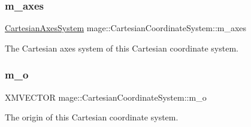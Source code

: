 \subsubsection{\texorpdfstring{m\+\_\+axes}{m\_axes}}
{\footnotesize\ttfamily \hyperlink{structmage_1_1_cartesian_axes_system}{Cartesian\+Axes\+System} mage\+::\+Cartesian\+Coordinate\+System\+::m\+\_\+axes\hspace{0.3cm}{\ttfamily [private]}}

The Cartesian axes system of this Cartesian coordinate system. \hypertarget{structmage_1_1_cartesian_coordinate_system_a1ea373bb91be991ee221a2ce1e02be2b}{}\label{structmage_1_1_cartesian_coordinate_system_a1ea373bb91be991ee221a2ce1e02be2b} 
\subsubsection{\texorpdfstring{m\+\_\+o}{m\_o}}
{\footnotesize\ttfamily X\+M\+V\+E\+C\+T\+OR mage\+::\+Cartesian\+Coordinate\+System\+::m\+\_\+o\hspace{0.3cm}{\ttfamily [private]}}

The origin of this Cartesian coordinate system. 